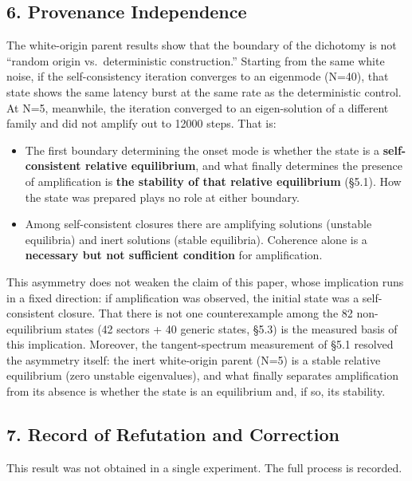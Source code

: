 \documentclass[
  a4paper,
]{article}
\providecommand{\tightlist}{%
  \setlength{\itemsep}{0pt}\setlength{\parskip}{0pt}}
\begin{document}
\subsection{6. Provenance Independence}\label{provenance-independence}

The white-origin parent results show that the boundary of the dichotomy
is not ``random origin vs.~deterministic construction.'' Starting from
the same white noise, if the self-consistency iteration converges to an
eigenmode (N=40), that state shows the same latency burst at the same
rate as the deterministic control. At N=5, meanwhile, the iteration
converged to an eigen-solution of a different family and did not amplify
out to 12000 steps. That is:

\begin{itemize}
\tightlist
\item
  The first boundary determining the onset mode is whether the state is
  a \textbf{self-consistent relative equilibrium}, and what finally
  determines the presence of amplification is \textbf{the stability of
  that relative equilibrium} (§5.1). How the state was prepared plays no
  role at either boundary.
\item
  Among self-consistent closures there are amplifying solutions
  (unstable equilibria) and inert solutions (stable equilibria).
  Coherence alone is a \textbf{necessary but not sufficient condition}
  for amplification.
\end{itemize}

This asymmetry does not weaken the claim of this paper, whose
implication runs in a fixed direction: if amplification was observed,
the initial state was a self-consistent closure. That there is not one
counterexample among the 82 non-equilibrium states (42 sectors + 40
generic states, §5.3) is the measured basis of this implication.
Moreover, the tangent-spectrum measurement of §5.1 resolved the
asymmetry itself: the inert white-origin parent (N=5) is a stable
relative equilibrium (zero unstable eigenvalues), and what finally
separates amplification from its absence is whether the state is an
equilibrium and, if so, its stability.

\subsection{7. Record of Refutation and
Correction}\label{record-of-refutation-and-correction}

This result was not obtained in a single experiment. The full process is
recorded.
\end{document}
